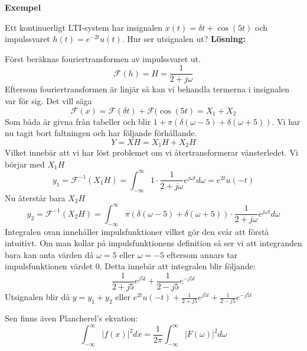 \documentclass{article}
\begin{document}
\textbf{Exempel} %

Ett kontinuerligt LTI-system har insignalen $x(t)=\delta{t} + \cos(5 t)$ och impulssvaret $h(t) = e^{-2 t} u(t)$. Hur ser utsignalen ut?
\textbf{Lösning:}

Först beräknas fouriertransformen av impulssvaret ut. 
\[\mathcal{F}(h) = H = \frac{1}{2+j \omega}\]
Eftersom fouriertransformen är linjär så kan vi behandla termerna i insignalen var för sig. Det vill säga 
\[\mathcal{F} (x) = \mathcal{F}(\delta{t}) + \mathcal{F}(\cos(5 t) = X_1 + X_2 \]
Som båda är givna från tabeller och blir $1+\pi(\delta(\omega - 5) + \delta(\omega + 5))$. Vi har nu tagit bort faltningen och har följande förhållande.
\[Y = X H = X_1 H + X_2 H\]
Vilket innebär att vi har löst problemet om vi återtransformerar vänsterledet. Vi börjar med $X_1 H$
\[y_1=\mathcal{F}^{-1}(X_1 H) =  \int_{-\infty}^{\infty} 1 \cdot \frac{1}{2+j \omega} e^{j \omega t} d\omega = e^{2 t} u(-t)\]
Nu återstår bara $X_2 H$
\[y_2=\mathcal{F}^{-1}(X_2 H) = \int_{-\infty}^{\infty} \pi(\delta(\omega - 5) + \delta(\omega + 5)) \cdot \frac{1}{2+j \omega} e^{j \omega t} d\omega \]
Integralen ovan innehåller impulsfunktioner vilket gör den svår att förstå intuitivt. Om man kollar på impulsfunktionens definition så ser vi att integranden bara kan anta värden då $\omega=5$ eller $\omega =-5$ eftersom annars tar impulsfunktionen värdet 0. Detta innebär att integralen blir följande:
$$\frac{1}{2+j 5} e^{j 5 t} + \frac{1}{2-j 5} e^{-j 5 t}$$ %
Utsignalen blir då $y=y_1 + y_2$ eller $e^{2 t} u(-t) + \frac{1}{2+j 5} e^{j 5 t} + \frac{1}{2-j 5} e^{-j 5 t}$

Sen finns även Plancherel's ekvation: %
\[\int_{-\infty}^{\infty} |f(x)|^2 dx = \frac{1}{2 \pi}\int_{-\infty}^{\infty} |F(\omega)|^2 d\omega \] %
\end{document}
